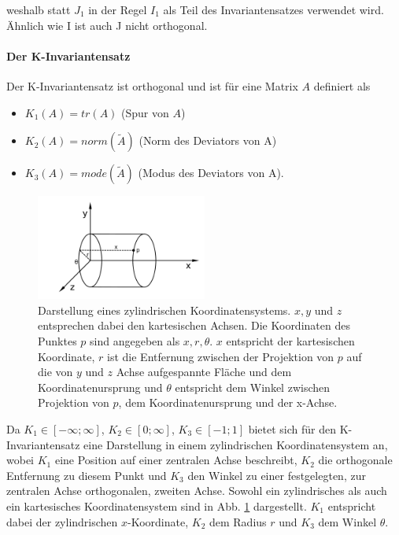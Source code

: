 \documentclass[a4paper,fontsize=12pt,toc=bib,halfparskip]{scrartcl}
\begin{document}
weshalb statt $J_1$ in der Regel $I_1$ als Teil des Invariantensatzes verwendet wird. \"Ahnlich wie I ist auch J nicht orthogonal.

\paragraph{Der K-Invariantensatz}
Der K-Invariantensatz ist orthogonal und ist f\"ur eine Matrix $A$ definiert als

\begin{itemize}
	\item $K_1(A)=tr(A)$ (Spur von $A$)
	\item $K_2(A)=norm(\tilde{A})$ (Norm des Deviators von A)
	\item $K_3(A)=mode(\tilde{A})$ (Modus des Deviators von A).
\end{itemize}


\begin{figure}
	\centering
	\includegraphics[width=0.5\textwidth]{pictures/cylinder}
	\caption{Darstellung eines zylindrischen Koordinatensystems. $x,y$ und $z$ entsprechen dabei den kartesischen Achsen. Die Koordinaten des Punktes $p$ sind angegeben als $x, r, \theta$. $x$ entspricht der kartesischen Koordinate, $r$ ist die Entfernung zwischen der Projektion von $p$ auf die von $y$ und $z$ Achse aufgespannte Fl\"ache und dem Koordinatenursprung und $\theta$ entspricht dem Winkel zwischen Projektion von $p$, dem Koordinatenursprung und der x-Achse. }
	\label{cylinderCoords}
\end{figure}

Da $K_1 \in [-\infty; \infty]$, $K_2 \in [0;\infty]$, $K_3 \in [-1;1]$ bietet sich f\"ur den K-Invariantensatz eine Darstellung in einem zylindrischen Koordinatensystem an, wobei $K_1$ eine Position auf einer zentralen Achse beschreibt, $K_2$ die orthogonale Entfernung zu diesem Punkt und $K_3$ den Winkel zu einer festgelegten, zur zentralen Achse orthogonalen, zweiten Achse. Sowohl ein zylindrisches als auch ein kartesisches Koordinatensystem sind in Abb. \ref{cylinderCoords} dargestellt. $K_1$ entspricht dabei der zylindrischen $x$-Koordinate, $K_2$ dem Radius $r$ und $K_3$ dem Winkel $\theta$.
\end{document}
